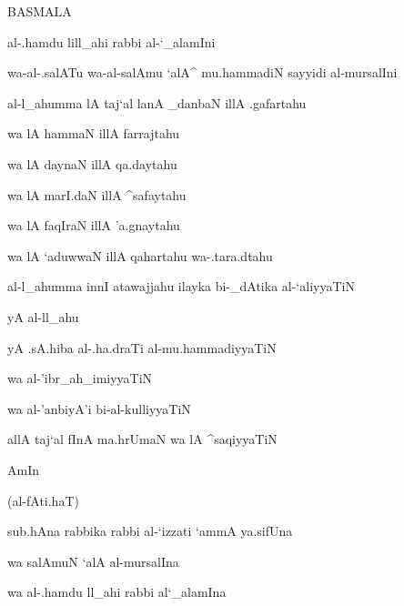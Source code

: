 \documentclass{minimal}
\begin{document}





\begin{arab}

BASMALA

al-.hamdu lill_ahi rabbi al-`_alamIni

wa-al-.salATu wa-al-salAmu `alA^ mu.hammadiN sayyidi al-mursalIni

al-l_ahumma lA taj`al lanA _danbaN illA .gafartahu

wa lA hammaN illA farrajtahu

wa lA daynaN illA qa.daytahu

wa lA marI.daN illA ^safaytahu

wa lA faqIraN illA 'a.gnaytahu

wa lA `aduwwaN illA qahartahu wa-.tara.dtahu

al-l_ahumma innI atawajjahu ilayka bi-_dAtika al-`aliyyaTiN

yA al-ll_ahu

yA .sA.hiba al-.ha.draTi al-mu.hammadiyyaTiN

wa al-'ibr_ah_imiyyaTiN

wa al-'anbiyA'i bi-al-kulliyyaTiN

allA taj`al fInA ma.hrUmaN wa lA ^saqiyyaTiN

AmIn

(al-fAti.haT)

sub.hAna rabbika rabbi al-`izzati `ammA ya.sifUna

wa salAmuN `alA al-mursalIna

wa al-.hamdu ll_ahi rabbi al`_alamIna

\end{arab}
\end{document}
